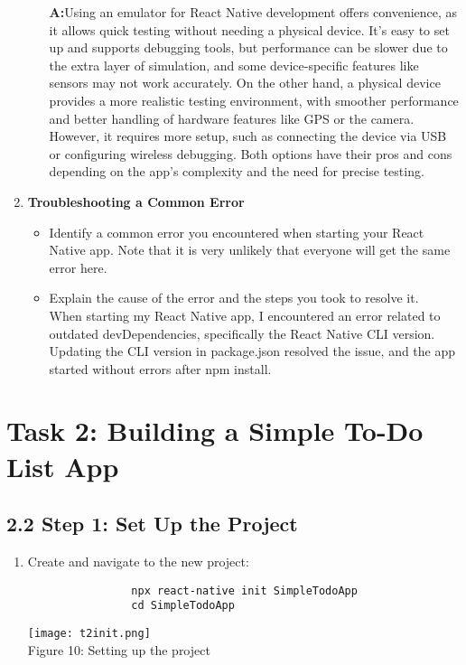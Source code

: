 \documentclass{article}
\begin{document}
\begin{enumerate}
\begin{itemize}
                    \textbf{A:}Using an emulator for React Native development offers convenience, as it allows quick testing without needing a physical device. It's easy to set up and supports debugging tools, but performance can be slower due to the extra layer of simulation, and some device-specific features like sensors may not work accurately. On the other hand, a physical device provides a more realistic testing environment, with smoother performance and better handling of hardware features like GPS or the camera. However, it requires more setup, such as connecting the device via USB or configuring wireless debugging. Both options have their pros and cons depending on the app’s complexity and the need for precise testing.

                    
                \end{itemize}
            \item \textbf{Troubleshooting a Common Error }
                \begin{itemize}
                    \item Identify a common error you encountered when starting your React Native app. Note that it is very unlikely that everyone will get the same error here.
                    \item Explain the cause of the error and the steps you took to resolve it.
                    \\
                    When starting my React Native app, I encountered an error related to outdated devDependencies, specifically the React Native CLI version. Updating the CLI version in package.json resolved the issue, and the app started without errors after npm install.
                \end{itemize}
        \end{enumerate}

        \section*{Task 2: Building a Simple To-Do List App }
        \subsection*{2.2 Step 1: Set Up the Project}

        \begin{enumerate}
            \item Create and navigate to the new project:
                \begin{verbatim}
                npx react-native init SimpleTodoApp
                cd SimpleTodoApp
                \end{verbatim}
                 \centering
                        \texttt{[image: t2init.png]}\\
                        \caption{Figure 10: Setting up the project}

        \end{enumerate}
\end{document}
